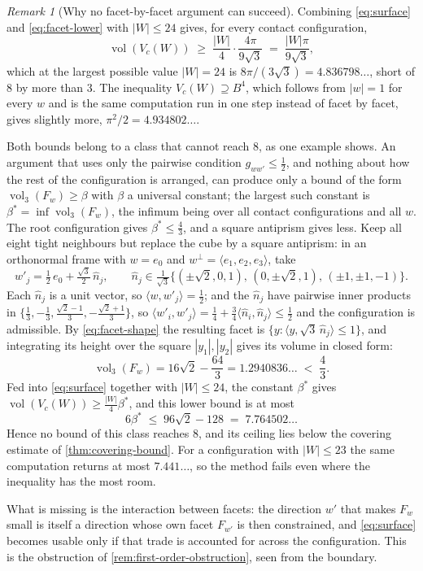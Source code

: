 \documentclass[11pt,reqno]{amsart}
\renewcommand{\_}{\origunderscore\allowbreak}
\numberwithin{equation}{section}
\theoremstyle{plain}
\theoremstyle{definition}
\theoremstyle{remark}
\newtheorem{remark}[thm]{Remark}
\DeclareMathOperator{\vol}{vol}
\begin{document}
\begin{remark}[Why no facet-by-facet argument can succeed]\label{rem:facet-local-obstruction}
Combining \eqref{eq:surface} and \eqref{eq:facet-lower} with
$|W|\le24$ gives, for every contact configuration,
\[
  \vol(V_c(W))\;\ge\;\frac{|W|}{4}\cdot\frac{4\pi}{9\sqrt3}
  \;=\;\frac{|W|\pi}{9\sqrt3},
\]
which at the largest possible value $|W|=24$ is
$8\pi/(3\sqrt3)=4.836798\ldots$, short of $8$ by more than $3$. The
inequality $V_c(W)\supseteq B^4$, which follows from $|w|=1$ for every
$w$ and is the same computation run in one step instead of facet by
facet, gives slightly more, $\pi^2/2=4.934802\ldots$.

Both bounds belong to a class that cannot reach $8$, as one example
shows. An argument that uses only the pairwise condition
$g_{ww'}\le\tfrac12$, and nothing about how the rest of the
configuration is arranged, can produce only a bound of the form
$\vol_3(F_w)\ge\beta$ with $\beta$ a universal constant; the largest
such constant is
$\beta^{*}=\inf\vol_3(F_w)$, the infimum being over all contact
configurations and all $w$. The root configuration gives
$\beta^{*}\le\tfrac43$, and a square antiprism gives less. Keep all eight tight
neighbours but replace the cube by a square antiprism: in an orthonormal
frame with $w=e_0$ and $w^{\perp}=\langle e_1,e_2,e_3\rangle$, take
\begin{equation}\label{eq:antiprism}
  w'_j=\tfrac12\,e_0+\tfrac{\sqrt3}{2}\,\widehat n_j,
  \qquad
  \widehat n_j\in\tfrac{1}{\sqrt3}\bigl\{(\pm\sqrt2,0,1),\,
  (0,\pm\sqrt2,1),\,(\pm1,\pm1,-1)\bigr\}.
\end{equation}
Each $\widehat n_j$ is a unit vector, so
$\langle w,w'_j\rangle=\tfrac12$; and the $\widehat n_j$ have pairwise
inner products in
$\{\tfrac13,-\tfrac13,\tfrac{\sqrt2-1}{3},-\tfrac{\sqrt2+1}{3}\}$,
so $\langle w'_i,w'_j\rangle=\tfrac14+\tfrac34\langle\widehat
n_i,\widehat n_j\rangle\le\tfrac12$ and the configuration is
admissible. By \eqref{eq:facet-shape} the resulting facet is
$\{y:\langle y,\sqrt3\,\widehat n_j\rangle\le1\}$, and integrating
its height over the square $|y_1|,|y_2|$ gives its volume in closed
form:
\[
  \vol_3(F_w)=16\sqrt2-\frac{64}{3}=1.2940836\ldots\;<\;\frac43 .
\]
Fed into \eqref{eq:surface} together with $|W|\le24$, the constant
$\beta^{*}$ gives $\vol(V_c(W))\ge\frac{|W|}{4}\beta^{*}$, and this lower
bound is at most
\[
  6\beta^{*}\;\le\;96\sqrt2-128\;=\;7.764502\ldots
\]
Hence no bound of this class reaches $8$, and its ceiling lies below
the covering estimate of \cref{thm:covering-bound}. For a configuration
with $|W|\le23$ the same computation returns at most $7.441\ldots$, so
the method fails even where the inequality has the most room.

What is missing is the interaction between facets: the direction $w'$
that makes $F_w$ small is itself a direction whose own facet $F_{w'}$ is
then constrained, and \eqref{eq:surface} becomes usable only if that
trade is accounted for across the configuration. This is the obstruction
of \cref{rem:first-order-obstruction}, seen from the boundary.
\end{remark}
\end{document}
